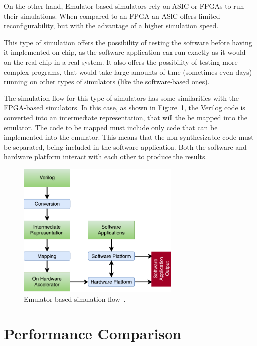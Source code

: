 On the other hand, Emulator-based simulators rely on \ac{ASIC} or \ac{FPGA}s to run their
simulations. When compared to an \ac{FPGA} an \ac{ASIC} offers limited
reconfigurability, but with the advantage of a higher simulation speed.

This type of simulation offers the possibility of testing the software before
having it implemented on chip, as the software application can run exactly as it
would on the real chip in a real system. It also offers the possibility of
testing more complex programs, that would take large amounts of time (sometimes
even days) running on other types of simulators (like the software-based ones).

The simulation flow for this type of simulators has some similarities with the
\ac{FPGA}-based simulators. In this case, as shown in Figure~\ref{fig:emulator}, the
Verilog code is converted into an intermediate representation, that will the be
mapped into the emulator. The code to be mapped must include only code that can
be implemented into the emulator. This means that the non synthesizable code
must be separated, being included in the software application. Both the software
and hardware platform interact with each other to produce the results.

\begin{figure}[!htb]
	\centering
	\includegraphics[width=0.7\textwidth]{Figures/Emulatorsim.pdf}
	\caption{Emulator-based simulation flow~\cite{khandelwal:gatelevel}.}
	\label{fig:emulator}
\end{figure}

\section{Performance Comparison}
\label{section:performance}

